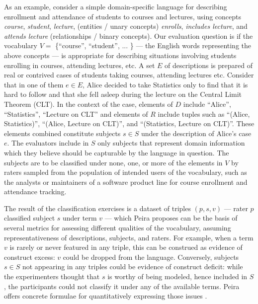 As an example, consider a simple domain-specific language for describing enrollment and attendance of students to courses and lectures, using concepts \textit{course}, \textit{student}, \textit{lecture}, (entities / unary concepts) \textit{enrolls}, \textit{includes lecture}, and \textit{attends lecture} (relationships / binary concepts). Our evaluation question is if the vocabulary $V = $ \{``course'', ``student'', ... \} --- the English words representing the above concepts --- is appropriate for describing situations involving students enrolling in courses, attending lectures, etc. A set $E$ of descriptions is prepared of real or contrived cases of students taking courses, attending lectures etc. Consider that in one of them $e\in E$, Alice decided to take Statistics only to find that it is hard to follow and that she fell asleep during the lecture on the Central Limit Theorem (CLT). In the context of the case, elements of $D$ include ``Alice'', ``Statistics'', ``Lecture on CLT'' and elements of $R$ include tuples such as ``(Alice, Statistics)'', ``(Alice, Lecture on CLT)'', and ``(Statistics, Lecture on CLT)''. These elements combined constitute subjects $s\in S$ under the description of Alice's case $e$. 
The evaluators include in $S$ only subjects that represent domain information which they believe should be capturable by the language in question. The subjects are to be classified under none, one, or more of the elements in $V$ by raters sampled from the population of intended users of the vocabulary, such as the analysts or maintainers of a software product line for course enrollment and attendance tracking.

The result of the classification exercises is a dataset of triples $(p,s,v)$ --- rater $p$ classified subject $s$ under term $v$ --- which Peira proposes can be the basis of several metrics for assessing different qualities of the vocabulary, assuming representativeness of descriptions, subjects, and raters. For example, when a term $v$ is rarely or never featured in any triple, this can be construed as evidence of construct excess: $v$ could be dropped from the language. Conversely, subjects $s\in S$ not appearing in any triples could be evidence of construct deficit: while the experimenters thought that $s$ is worthy of being modeled, hence included in $S$, the participants could not classify it under any of the available terms. Peira offers concrete formulae for quantitatively expressing those issues \cite{LZMK.24}. 

